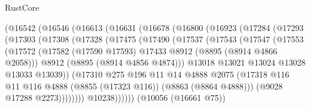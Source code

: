 \begin{lexlean}{RustCore}
\begin{coremodule}
                (@16542
                  (@16546
                    (@16613
                      (@16631
                        (@16678
                          (@16800
                            (@16923
                              (@17284
                                (@17293
                                  (@17303
                                    (@17308
                                      (@17328
                                        (@17475
                                          (@17490
                                            (@17537
                                              (@17543
                                                (@17547
                                                  (@17553
                                                    (@17572
                                                      (@17582
                                                        (@17590 @17593)
                                                        @17433
                                                        @8912
                                                        (@8895 (@8914 @4866 @2058)))
                                                      @8912
                                                      (@8895 (@8914 @4856 @4874)))
                                                    @13018
                                                    @13021
                                                    @13024
                                                    @13028
                                                    @13033
                                                    @13039))
                                                (@17310
                                                  @275
                                                  @196
                                                  @11
                                                  @14
                                                  @4888
                                                  @2075
                                                  (@17318
                                                    @116
                                                    @11
                                                    @116
                                                    @4888
                                                    (@8855 (@17323 @116))
                                                    (@8863 (@8864 @4888)))
                                                  (@9028 @17288 @2273))))))))
                                    @10238))))))
                        (@10056 (@16661 @75))

\end{coremodule}
\end{lexlean}
